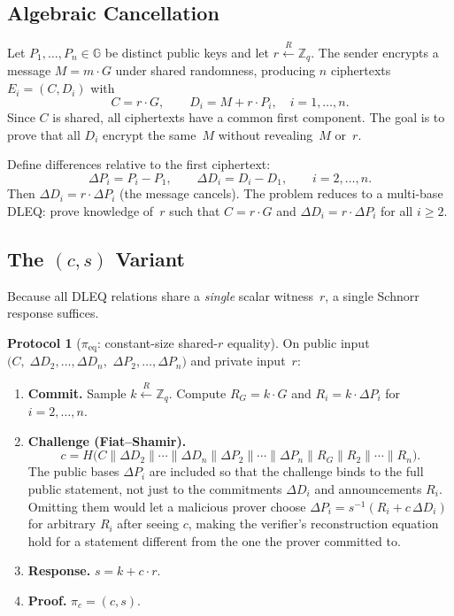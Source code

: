 \documentclass[11pt]{article}
\theoremstyle{definition}
\newtheorem{protocol}[theorem]{Protocol}
\newcommand{\G}{\mathbb{G}}
\newcommand{\Zq}{\mathbb{Z}_q}
\begin{document}
\subsection{Algebraic Cancellation}

Let $P_1, \ldots, P_n \in \G$ be distinct public keys and let
$r \xleftarrow{R} \Zq$.
The sender encrypts a message $M = m \cdot G$ under shared
randomness, producing $n$ ciphertexts $E_i = (C, D_i)$ with
\[
  C = r \cdot G, \qquad
  D_i = M + r \cdot P_i, \quad i = 1, \ldots, n.
\]
Since $C$ is shared, all ciphertexts have a common first component.
The goal is to prove that all $D_i$ encrypt the same~$M$
without revealing~$M$ or~$r$.

Define differences relative to the first ciphertext:
\[
  \Delta P_i = P_i - P_1, \qquad
  \Delta D_i = D_i - D_1, \qquad i = 2, \ldots, n.
\]
Then $\Delta D_i = r \cdot \Delta P_i$ (the message cancels).
The problem reduces to a multi-base DLEQ: prove knowledge of~$r$ such
that $C = r \cdot G$ and
$\Delta D_i = r \cdot \Delta P_i$ for all $i \geq 2$.

\subsection{\texorpdfstring{The $(c, s)$ Variant}{The (c, s) Variant}}

Because all DLEQ relations share a \emph{single} scalar witness~$r$,
a single Schnorr response suffices.

\begin{protocol}[$\pi_{\mathrm{eq}}$: constant-size shared-$r$ equality]
  \label{prot:equality-o1}
  On public input
  $\bigl(C,\; \Delta D_2, \ldots, \Delta D_n,$
  $\Delta P_2, \ldots, \Delta P_n\bigr)$
  and private input~$r$:

  \begin{enumerate}
    \item \textbf{Commit.}
          Sample $k \xleftarrow{R} \Zq$.
          Compute $R_G = k \cdot G$ and
          $R_i = k \cdot \Delta P_i$ for $i = 2, \ldots, n$.

    \item \textbf{Challenge (Fiat--Shamir).}
          \[
            c = H\bigl(C
            \| \Delta D_2 \| \cdots \| \Delta D_n
            \| \Delta P_2 \| \cdots \| \Delta P_n
            \| R_G \| R_2 \| \cdots \| R_n\bigr).
          \]
          The public bases $\Delta P_i$ are included so that
          the challenge binds to the full public statement,
          not just to the commitments $\Delta D_i$ and
          announcements $R_i$.  Omitting them would let a
          malicious prover choose $\Delta P_i = s^{-1}(R_i + c\,\Delta D_i)$
          for arbitrary $R_i$ after seeing $c$, making the
          verifier's reconstruction equation hold for a
          statement different from the one the prover
          committed to.

    \item \textbf{Response.}
          $s = k + c \cdot r$.

    \item \textbf{Proof.}
          $\pi_c = (c, s)$.
  \end{enumerate}
\end{protocol}
\end{document}
